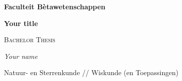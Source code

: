 \documentclass[thesis]{subfiles}
\begin{document}
\begin{titlepage}
    \par\vspace{0.5cm}
    
    \begin{flushright}
    {\LARGE\bfseries Faculteit B\`etawetenschappen \par} %
    \end{flushright}
	\vspace{0.5cm}
    \begin{center}
    {\huge\bfseries Your title \par} %
    \end{center}
	\vspace{0.75cm}
    {\scshape\Large Bachelor Thesis\par}
	\vspace{0.25cm} %
	{\Large\itshape Your name\par} %
    \vspace{0.5cm}
    {\Large Natuur- en Sterrenkunde // Wiskunde (en Toepassingen)}\par %
    \vspace{0.75cm}
    \centering
\end{titlepage}
\end{document}
